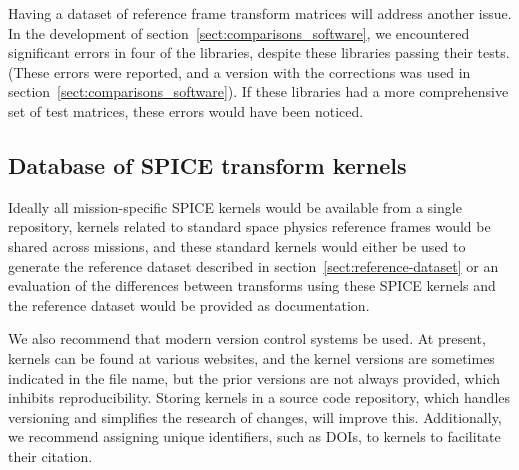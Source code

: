 \documentclass[draft]{agujournal2019}
\begin{document}

Having a dataset of reference frame transform matrices will address another issue. In the development of section~\ref{sect:comparisons_software}, we encountered significant errors in four of the libraries, despite these libraries passing their tests. (These errors were reported, and a version with the corrections was used in section~\ref{sect:comparisons_software}). If these libraries had a more comprehensive set of test matrices, these errors would have been noticed.




\subsection{Database of SPICE transform kernels}




Ideally all mission-specific SPICE kernels would be available from a single repository, kernels related to standard space physics reference frames would be shared across missions, and these standard kernels would either be used to generate the reference dataset described in section~\ref{sect:reference-dataset} or an evaluation of the differences between transforms using these SPICE kernels and the reference dataset would be provided as documentation.

We also recommend that modern version control systems be used. At present, kernels can be found at various websites, and the kernel versions are sometimes indicated in the file name, but the prior versions are not always provided, which inhibits reproducibility. Storing kernels in a source code repository, which handles versioning and simplifies the research of changes, will improve this. Additionally, we recommend assigning unique identifiers, such as DOIs, to kernels to facilitate their citation.
\end{document}

